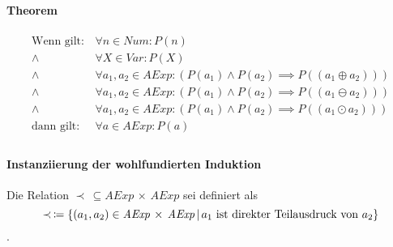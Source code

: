 																\paragraph{Theorem}
																	\begin{align*}
																		\text{Wenn gilt:} & \,\forall n \in \textit{Num} : P(n)                                                                    \\
																		\land             & \,\forall X \in \textit{Var} : P(X)                                                                    \\
																		\land             & \,\forall a _ 1, a _ 2 \in \textit{AExp} : (P(a _ 1) \land P(a _ 2) \implies P((a _ 1 \oplus a _ 2)))  \\
																		\land             & \,\forall a _ 1, a _ 2 \in \textit{AExp} : (P(a _ 1) \land P(a _ 2) \implies P((a _ 1 \ominus a _ 2))) \\
																		\land             & \,\forall a _ 1, a _ 2 \in \textit{AExp} : (P(a _ 1) \land P(a _ 2) \implies P((a _ 1 \odot a _ 2)))   \\
																		\text{dann gilt:} & \,\forall a \in \textit{AExp} : P(a)                                                                   \\
																	\end{align*}

																\paragraph{Instanziierung der wohlfundierten Induktion}

																	Die Relation $ \prec \,\subseteq \textit{AExp} \,\times\, \textit{AExp} $ sei definiert als \[ \prec \,\coloneqq \{ (a _ 1, a _ 2) \in \textit{AExp} \,\times\, \textit{AExp} \,\vert\, a _ 1 \text{ ist direkter Teilausdruck von } a _ 2 \} \].


